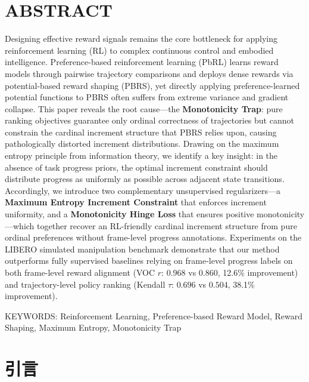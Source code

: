 \section*{ABSTRACT}
Designing effective reward signals remains the core bottleneck for applying reinforcement learning (RL) to complex continuous control and embodied intelligence. Preference-based reinforcement learning (PbRL) learns reward models through pairwise trajectory comparisons and deploys dense rewards via potential-based reward shaping (PBRS), yet directly applying preference-learned potential functions to PBRS often suffers from extreme variance and gradient collapse. This paper reveals the root cause---the \textbf{Monotonicity Trap}: pure ranking objectives guarantee only ordinal correctness of trajectories but cannot constrain the cardinal increment structure that PBRS relies upon, causing pathologically distorted increment distributions. Drawing on the maximum entropy principle from information theory, we identify a key insight: in the absence of task progress priors, the optimal increment constraint should distribute progress as uniformly as possible across adjacent state transitions. Accordingly, we introduce two complementary unsupervised regularizers---a \textbf{Maximum Entropy Increment Constraint} that enforces increment uniformity, and a \textbf{Monotonicity Hinge Loss} that ensures positive monotonicity---which together recover an RL-friendly cardinal increment structure from pure ordinal preferences without frame-level progress annotations. Experiments on the LIBERO simulated manipulation benchmark demonstrate that our method outperforms fully supervised baselines relying on frame-level progress labels on both frame-level reward alignment (VOC $r$: $0.968$ vs $0.860$, 12.6\% improvement) and trajectory-level policy ranking (Kendall $\tau$: $0.696$ vs $0.504$, 38.1\% improvement).

\vspace{1em}\noindent
{\hei KEYWORDS:}
{\songti \rmfamily Reinforcement Learning, Preference-based Reward Model, Reward Shaping, Maximum Entropy, Monotonicity Trap}

\clearpage



\setcounter{page}{1}

\section{引言}

